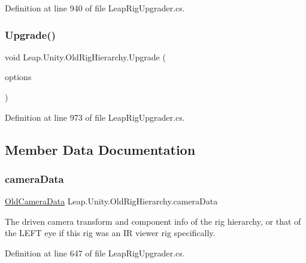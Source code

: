 Definition at line 940 of file Leap\+Rig\+Upgrader.\+cs.

\mbox{\label{class_leap_1_1_unity_1_1_old_rig_hierarchy_a3b5f9882e0f1fe11166886bdbf0f4029}} 
\subsubsection{\texorpdfstring{Upgrade()}{Upgrade()}}
{\footnotesize\ttfamily void Leap.\+Unity.\+Old\+Rig\+Hierarchy.\+Upgrade (\begin{DoxyParamCaption}\item[{\mbox{\hyperlink{class_leap_1_1_unity_1_1_old_rig_hierarchy_1_1_upgrade_options}{Upgrade\+Options}}}]{options }\end{DoxyParamCaption})}



Definition at line 973 of file Leap\+Rig\+Upgrader.\+cs.



\subsection{Member Data Documentation}
\mbox{\label{class_leap_1_1_unity_1_1_old_rig_hierarchy_a1273b07cacb3db69876ad8bbf0eec077}} 
\subsubsection{\texorpdfstring{cameraData}{cameraData}}
{\footnotesize\ttfamily \mbox{\hyperlink{class_leap_1_1_unity_1_1_old_rig_hierarchy_1_1_old_camera_data}{Old\+Camera\+Data}} Leap.\+Unity.\+Old\+Rig\+Hierarchy.\+camera\+Data}



The driven camera transform and component info of the rig hierarchy, or that of the L\+E\+FT eye if this rig was an IR viewer rig specifically. 



Definition at line 647 of file Leap\+Rig\+Upgrader.\+cs.

